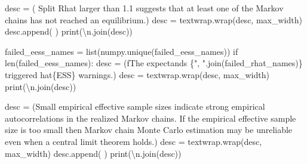 \documentclass[
  letterpaper,
  DIV=11,
  numbers=noendperiod]{scrartcl}
\newenvironment{Shaded}{\begin{snugshade}}{\end{snugshade}}
\newcommand{\BuiltInTok}[1]{\textcolor[rgb]{0.00,0.23,0.31}{#1}}
\newcommand{\CharTok}[1]{\textcolor[rgb]{0.13,0.47,0.30}{#1}}
\newcommand{\ControlFlowTok}[1]{\textcolor[rgb]{0.00,0.23,0.31}{#1}}
\newcommand{\NormalTok}[1]{\textcolor[rgb]{0.00,0.23,0.31}{#1}}
\newcommand{\OperatorTok}[1]{\textcolor[rgb]{0.37,0.37,0.37}{#1}}
\newcommand{\SpecialCharTok}[1]{\textcolor[rgb]{0.37,0.37,0.37}{#1}}
\newcommand{\SpecialStringTok}[1]{\textcolor[rgb]{0.13,0.47,0.30}{#1}}
\newcommand{\StringTok}[1]{\textcolor[rgb]{0.13,0.47,0.30}{#1}}
\begin{document}
\begin{Shaded}
\begin{Highlighting}[]
\NormalTok{    desc }\OperatorTok{=}\NormalTok{ (}\StringTok{\textquotesingle{}  Split Rhat larger than 1.1 suggests that at \textquotesingle{}}
            \StringTok{\textquotesingle{}least one of the Markov chains has not reached \textquotesingle{}}
            \StringTok{\textquotesingle{}an equilibrium.\textquotesingle{}}\NormalTok{)}
\NormalTok{    desc }\OperatorTok{=}\NormalTok{ textwrap.wrap(desc, max\_width)}
\NormalTok{    desc.append(}\StringTok{\textquotesingle{} \textquotesingle{}}\NormalTok{)}
    \BuiltInTok{print}\NormalTok{(}\StringTok{\textquotesingle{}}\CharTok{\textbackslash{}n}\StringTok{\textquotesingle{}}\NormalTok{.join(desc))}
   
\NormalTok{  failed\_eess\_names }\OperatorTok{=} \BuiltInTok{list}\NormalTok{(numpy.unique(failed\_eess\_names))}
  \ControlFlowTok{if} \BuiltInTok{len}\NormalTok{(failed\_eess\_names):}
\NormalTok{    desc }\OperatorTok{=}\NormalTok{ (}\SpecialStringTok{f\textquotesingle{}The expectands }\SpecialCharTok{\{}\StringTok{", "}\SpecialCharTok{.}\NormalTok{join(failed\_rhat\_names)}\SpecialCharTok{\}}\SpecialStringTok{ \textquotesingle{}}
             \StringTok{\textquotesingle{}triggered hat}\SpecialCharTok{\{ESS\}}\StringTok{ warnings.\textquotesingle{}}\NormalTok{)}
\NormalTok{    desc }\OperatorTok{=}\NormalTok{ textwrap.wrap(desc, max\_width)}
    \BuiltInTok{print}\NormalTok{(}\StringTok{\textquotesingle{}}\CharTok{\textbackslash{}n}\StringTok{\textquotesingle{}}\NormalTok{.join(desc))}
    
\NormalTok{    desc }\OperatorTok{=}\NormalTok{ (}\StringTok{\textquotesingle{}Small empirical effective sample sizes indicate strong \textquotesingle{}}
            \StringTok{\textquotesingle{}empirical autocorrelations in the realized Markov chains. \textquotesingle{}}
            \StringTok{\textquotesingle{}If the empirical effective sample size is too \textquotesingle{}}
            \StringTok{\textquotesingle{}small then Markov chain Monte Carlo estimation \textquotesingle{}}
            \StringTok{\textquotesingle{}may be unreliable even when a central limit \textquotesingle{}}
            \StringTok{\textquotesingle{}theorem holds.\textquotesingle{}}\NormalTok{)}
\NormalTok{    desc }\OperatorTok{=}\NormalTok{ textwrap.wrap(desc, max\_width)}
\NormalTok{    desc.append(}\StringTok{\textquotesingle{} \textquotesingle{}}\NormalTok{)}
    \BuiltInTok{print}\NormalTok{(}\StringTok{\textquotesingle{}}\CharTok{\textbackslash{}n}\StringTok{\textquotesingle{}}\NormalTok{.join(desc))}
\end{Highlighting}
\end{Shaded}
\end{document}
